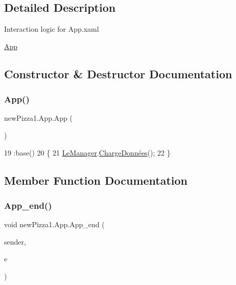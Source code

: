 \subsection{Detailed Description}
Interaction logic for App.\+xaml 

\hyperlink{classnewPizza1_1_1App}{App} 

\subsection{Constructor \& Destructor Documentation}
\mbox{\label{classnewPizza1_1_1App_aa51871ad89d5c680db7878c58c80e98e}} 
\subsubsection{\texorpdfstring{App()}{App()}}
{\footnotesize\ttfamily new\+Pizza1.\+App.\+App (\begin{DoxyParamCaption}{ }\end{DoxyParamCaption})\hspace{0.3cm}{\ttfamily [inline]}}


\begin{DoxyCode}
19                      :base()
20         \{
21             \hyperlink{classnewPizza1_1_1App_a40f3adef1e0176c5730f8d9ba525c010}{LeManager}.\hyperlink{classModele_1_1Manager_af864593f2ec5d93e298e54c838316bd6}{ChargeDonnées}();
22         \}
\end{DoxyCode}


\subsection{Member Function Documentation}
\mbox{\label{classnewPizza1_1_1App_adb889537b1e18b9309daa743947fd0db}} 
\subsubsection{\texorpdfstring{App\+\_\+end()}{App\_end()}}
{\footnotesize\ttfamily void new\+Pizza1.\+App.\+App\+\_\+end (\begin{DoxyParamCaption}\item[{object}]{sender,  }\item[{Exit\+Event\+Args}]{e }\end{DoxyParamCaption})\hspace{0.3cm}{\ttfamily [inline]}}


